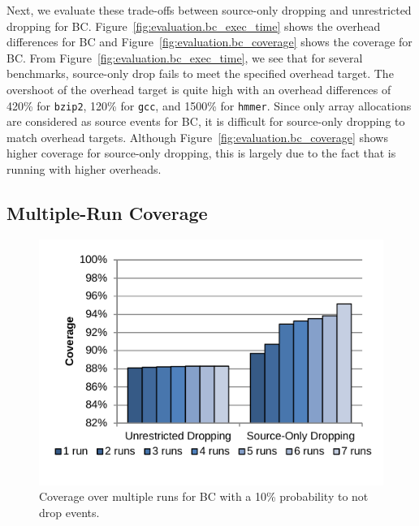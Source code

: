 Next, we evaluate these trade-offs between source-only dropping and unrestricted dropping for BC.
Figure~\ref{fig:evaluation.bc_exec_time} shows the overhead differences for BC
and Figure~\ref{fig:evaluation.bc_coverage} shows the coverage for BC.
From Figure~\ref{fig:evaluation.bc_exec_time}, we see that for several
benchmarks, source-only drop fails to meet the specified overhead target.
The overshoot of the overhead target is quite high with an overhead differences
of 420\% for {\tt bzip2}, 120\% for {\tt gcc}, and 1500\% for {\tt hmmer}.
Since only array allocations are considered as source events for BC, it is
difficult for source-only dropping to match overhead targets. Although
Figure~\ref{fig:evaluation.bc_coverage} shows higher coverage for
source-only dropping, this is largely due to the fact that is running with
higher overheads.

\subsection{Multiple-Run Coverage}

\begin{figure}
  \begin{center}
    \includegraphics[width=\columnwidth, clip=true, trim=0 0.2in 0 0]{figs/data_multirun_coverage.pdf}
    \vspace{-0.2in}
    \caption{Coverage over multiple runs for BC with a 10\% probability to not drop events.}
    \label{fig:evaluation.multirun}
    \vspace{-0.1in}
  \end{center}
\end{figure}

